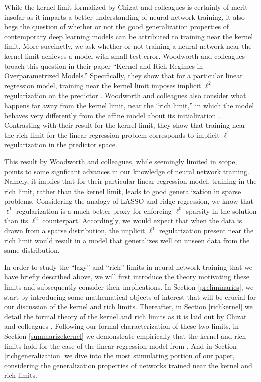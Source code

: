 \documentclass{article}
\begin{document}
While the kernel limit formalized by Chizat and colleagues is certainly of merit insofar as it imparts a better understanding of neural network training, it also begs the question of whether or not the good generalization properties of contemporary deep learning models can be attributed to training near the kernel limit. More succinctly, we ask whether or not training a neural network near the kernel limit achieves a model with small test error. Woodworth and colleagues broach this question in their paper \enquote{Kernel and Rich Regimes in Overparametrized Models.} Specifically, they show that for a particular linear regression model, training near the kernel limit imposes implicit $\ell^2$ regularization on the predictor \cite{woodworth2020kernel}. Woodworth and colleagues also consider what happens far away from the kernel limit, near the \enquote{rich limit,} in which the model behaves very differently from the affine model about its initialization \cite{woodworth2020kernel}. Contrasting with their result for the kernel limit, they show that training near the rich limit for the linear regression problem corresponds to implicit $\ell^1$ regularization in the predictor space.

This result by Woodworth and colleagues, while seemingly limited in scope, points to some signficant advances in our knowledge of neural network training. Namely, it implies that for their particular linear regression model, training in the rich limit, rather than the kernel limit, leads to good generalization in sparse problems. Considering the analogy of LASSO and ridge regression, we know that $\ell^1$ regularization is a much better proxy for enforcing $\ell^0$ sparsity in the solution than its $\ell^2$ counterpart. Accordingly, we would expect that when the data is drawn from a sparse distribution, the implicit $\ell^1$ regularization present near the rich limit would result in a model that generalizes well on unseen data from the same distribution.

In order to study the \enquote{lazy} and \enquote{rich} limits in neural network training that we have briefly described above, we will first introduce the theory motivating these limits and subsequently consider their implications. In Section \ref{preliminaries}, we start by introducing some mathematical objects of interest that will be crucial for our discussion of the kernel and rich limits. Thereafter, in Section \ref{richkernel} we detail the formal theory of the kernel and rich limits as it is laid out by Chizat and colleagues \cite{chizat2019lazy}. Following our formal characterization of these two limits, in Section \ref{summarizekernel} we demonstrate empirically that the kernel and rich limits hold for the case of the linear regression model from \cite{woodworth2020kernel}. And in Section \ref{richgeneralization} we dive into the most stimulating portion of our paper, considering the generalization properties of networks trained near the kernel and rich limits.
\end{document}

